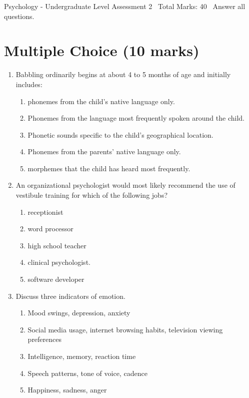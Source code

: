 \documentclass[12pt]{article}
\begin{document}
\begin{center}
Psychology - Undergraduate Level Assessment 2 \
Total Marks: 40 \
Answer all questions.
\end{center}

\section*{Multiple Choice (10 marks)}
\begin{enumerate}[label=\arabic*.]
\item Babbling ordinarily begins at about 4 to 5 months of age and initially includes:
\begin{enumerate}[label=(\alph*)]
    \item phonemes from the child's native language only.
    \item Phonemes from the language most frequently spoken around the child.
    \item Phonetic sounds specific to the child's geographical location.
    \item Phonemes from the parents' native language only.
    \item morphemes that the child has heard most frequently.
\end{enumerate}
\item An organizational psychologist would most likely recommend the use of vestibule training
for which of the following jobs?
\begin{enumerate}[label=(\alph*)]
    \item receptionist
    \item word processor
    \item high school teacher
    \item clinical psychologist.
    \item software developer
\end{enumerate}
\item Discuss three indicators of emotion.
\begin{enumerate}[label=(\alph*)]
    \item Mood swings, depression, anxiety
    \item Social media usage, internet browsing habits, television viewing preferences
    \item Intelligence, memory, reaction time
    \item Speech patterns, tone of voice, cadence
    \item Happiness, sadness, anger
\end{enumerate}

\end{enumerate}
\end{document}
